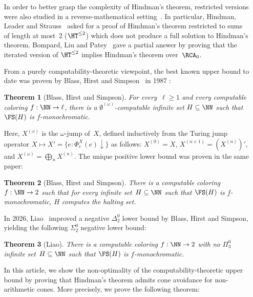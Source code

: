 \documentclass{article}
\newtheorem{theorem}{Theorem}
\numberwithin{theorem}{section}
\begin{document}
In order to better grasp the complexity of Hindman's theorem, restricted versions were also studied in a reverse-mathematical setting~\cite{carlucciWeakStrongRestrictions2016,carlucciWeakVariantHindman2017,carlucci2020new,dzhafarovEffectivenessHindmanTheorem2017}. In particular, Hindman, Leader and Strauss~\cite{hindman2003open} asked for a proof of Hindman's theorem restricted to sums of length at most~2 ($\HT^{\leq 2}$) which does not produce a full solution to Hindman's theorem. Bompard, Liu and Patey~\cite{bompardReverseMathematicsCarlson2022} gave a partial answer by proving that the iterated version of $\HT^{\leq 2}$ implies Hindman's theorem over~$\RCA_0$.

From a purely computability-theoretic viewpoint, the best known upper bound to date was proven by Blass, Hirst and Simpson~\cite{blassLogicalAnalysisTheorems1987} in 1987 :

\begin{theorem}[Blass, Hirst and Simpson]
For every~$\ell \geq 1$ and every computable coloring $f : \NN \to \ell$, there is a $\emptyset^{(\omega)}$-computable infinite set $H \subseteq \NN$ such that $\FS(H)$ is $f$-monochromatic.
\end{theorem}

Here, $X^{(\omega)}$ is the $\omega$-jump of~$X$, defined inductively from the Turing jump operator $X \mapsto X' = \{ e : \Phi^X_e(e)\downarrow \}$ as follows: $X^{(0)} = X$, $X^{(n+1)} = (X^{(n)})'$, and $X^{(\omega)} = \bigoplus_n X^{(n)}$. The unique positive lower bound was proven in the same paper:

\begin{theorem}[Blass, Hirst and Simpson]
There is a computable coloring $f : \NN \to 2$ such that for every infinite set~$H \subseteq \NN$ 
such that $\FS(H)$ is $f$-monochromatic, $H$ computes the halting set.
\end{theorem}

In 2026, Liao~\cite{liao2026recursive} improved a negative $\Delta^0_2$ lower bound by Blass, Hirst and Simpson, yielding the following $\Sigma^0_2$ negative lower bound:

\begin{theorem}[Liao]
There is a computable coloring $f : \NN \to 2$ with no $\Pi^0_3$ infinite set~$H \subseteq \NN$ such that $\FS(H)$ is $f$-monochromatic.
\end{theorem}

In this article, we show the non-optimality of the computability-theoretic upper bound by proving that Hindman's theorem admits cone avoidance for non-arithmetic cones. More precisely, we prove the following theorem:
\end{document}
